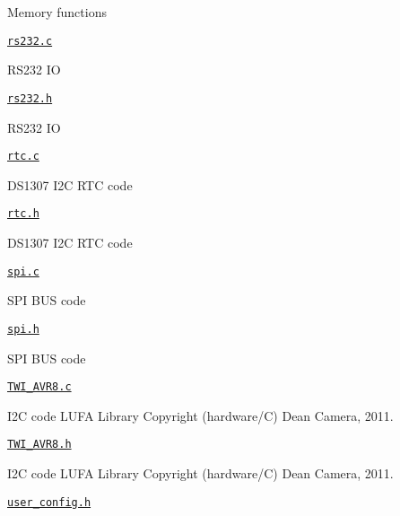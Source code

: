\begin{DoxyItemize}
\begin{DoxyItemize}
\begin{DoxyItemize}
\item Memory functions
\end{DoxyItemize}
\item \href{hardware/rs232.c}{\tt rs232.\+c}
\begin{DoxyItemize}
\item R\+S232 IO
\end{DoxyItemize}
\item \href{hardware/rs232.h}{\tt rs232.\+h}
\begin{DoxyItemize}
\item R\+S232 IO
\end{DoxyItemize}
\item \href{hardware/rtc.c}{\tt rtc.\+c}
\begin{DoxyItemize}
\item D\+S1307 I2C R\+TC code
\end{DoxyItemize}
\item \href{hardware/rtc.h}{\tt rtc.\+h}
\begin{DoxyItemize}
\item D\+S1307 I2C R\+TC code
\end{DoxyItemize}
\item \href{hardware/spi.c}{\tt spi.\+c}
\begin{DoxyItemize}
\item S\+PI B\+US code
\end{DoxyItemize}
\item \href{hardware/spi.h}{\tt spi.\+h}
\begin{DoxyItemize}
\item S\+PI B\+US code
\end{DoxyItemize}
\item \href{hardware/TWI_AVR8.c}{\tt T\+W\+I\+\_\+\+A\+V\+R8.\+c}
\begin{DoxyItemize}
\item I2C code L\+U\+FA Library Copyright (hardware/C) Dean Camera, 2011.
\end{DoxyItemize}
\item \href{hardware/TWI_AVR8.h}{\tt T\+W\+I\+\_\+\+A\+V\+R8.\+h}
\begin{DoxyItemize}
\item I2C code L\+U\+FA Library Copyright (hardware/C) Dean Camera, 2011.
\end{DoxyItemize}
\item \href{hardware/user_config.h}{\tt user\+\_\+config.\+h}
\begin{DoxyItemize}

\end{DoxyItemize}
\end{DoxyItemize}
\end{DoxyItemize}

